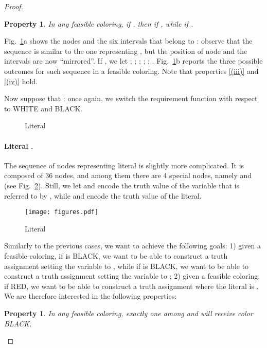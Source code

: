 \documentclass[a4paper,11pt]{article}
\theoremstyle{theorem}
\newtheorem{property}[theorem]{Property}
\begin{document}
\begin{proof}
\begin{property}\label{(iv)}
In any feasible coloring, if , then  if , while  if . 
\end{property}

\noindent Fig.~\ref{fig:3}a shows the nodes and the six intervals that belong to : observe that the sequence is similar to the one representing ,  but the position of node   and the intervals are now ``mirrored''.
If , we let ;  ;  ;  ;  ;  .  
Fig.~\ref{fig:3}b reports the three possible outcomes for such sequence in a feasible coloring.  
Note that properties \eqref{(iii)} and \eqref{(iv)} hold.

Now suppose that : once again, we switch the requirement function with respect to WHITE and BLACK.

\begin{figure}[htb]
\centering
{} \hspace*{0.05 \textwidth} 
\caption{Literal }
\label{fig:3}
\end{figure}

\paragraph{Literal .} The sequence of nodes representing literal  is slightly more complicated. It is composed of 36 nodes, and among them there are 4 special nodes, namely  and  (see Fig.~\ref{fig:4}). 
Still, we let  and  encode the truth value of the variable  that is referred to by , while  and  encode the truth value of the literal. 

\begin{figure}[htb]
\centering
\texttt{[image: figures.pdf]} 
\caption{Literal }
\label{fig:4}
\end{figure}

Similarly to the previous cases, we want to achieve the following goals: 1) given a feasible coloring, if  is BLACK, we want to be able to construct a truth assignment setting the variable  to , while if  is BLACK, we want to be able to construct a truth assignment setting the variable  to ; 2) given a feasible coloring, if  RED, we want to be able to construct a truth assignment where the literal  is . We are therefore interested in the following properties:

\begin{property}\label{(v)}
In any feasible coloring, exactly one among  and  will receive color BLACK.
\end{property}
 

\end{proof}
\end{document}
